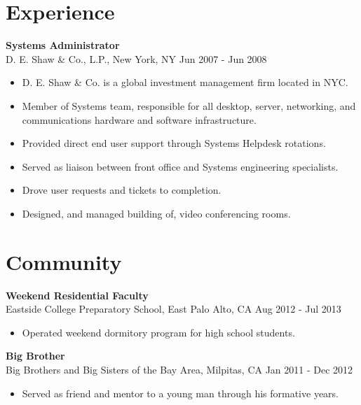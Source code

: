 \documentclass[line,margin]{res}
\begin{document}
\begin{resume}


\section{Experience}

\textbf{Systems Administrator} \\
D. E. Shaw \& Co., L.P., New York, NY \hfill Jun 2007 - Jun 2008
\begin{itemize}  \itemsep -2pt %
\item D. E. Shaw \& Co. is a global investment management firm located in NYC.
\item Member of Systems team, responsible for all desktop, server, networking,
      and communications hardware and software infrastructure.
\item Provided direct end user support through Systems Helpdesk rotations.
\item Served as liaison between front office and Systems engineering
      specialists.
\item Drove user requests and tickets to completion.
\item Designed, and managed building of, video conferencing rooms.
\end{itemize}


\section{Community}
\textbf{Weekend Residential Faculty} \\
Eastside College Preparatory School, East Palo Alto, CA \hfill Aug 2012 - Jul 2013
\begin{itemize}  \itemsep -2pt %
\item Operated weekend dormitory program for high school students.
\end{itemize}

\textbf{Big Brother} \\
Big Brothers and Big Sisters of the Bay Area, Milpitas, CA \hfill Jan 2011 - Dec 2012
\begin{itemize}  \itemsep -2pt %
\item Served as friend and mentor to a young man through his formative years.
\end{itemize}


\end{resume}
\end{document}
